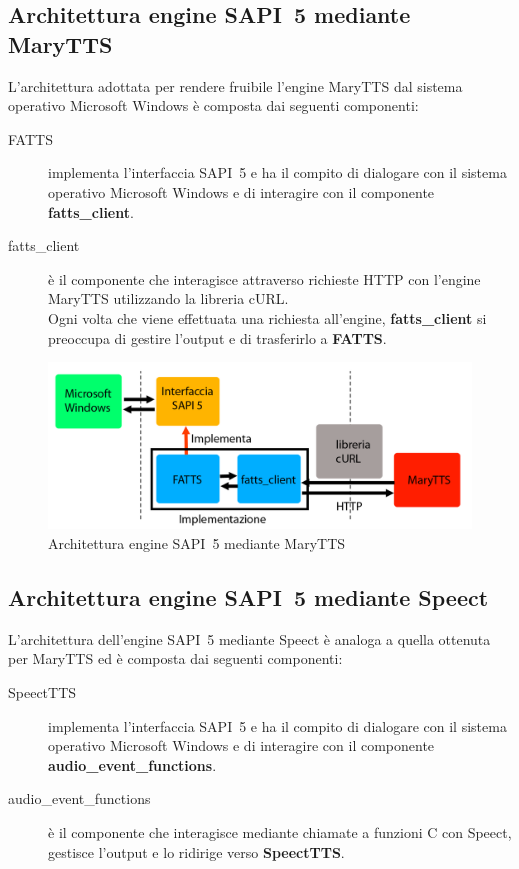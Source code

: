\subsection{Architettura engine SAPI~5 mediante MaryTTS}
L'architettura adottata per rendere fruibile l'engine MaryTTS dal sistema operativo Microsoft Windows è composta dai seguenti componenti:
\begin{description}
	\item[FATTS] implementa l'interfaccia SAPI~5 e ha il compito di dialogare con il sistema operativo Microsoft Windows e di interagire con il componente \textbf{fatts\_client}.
	\item[fatts\_client] è il componente che interagisce attraverso richieste HTTP con l'engine MaryTTS utilizzando la libreria cURL.\\
	Ogni volta che viene effettuata una richiesta all'engine, \textbf{fatts\_client} si preoccupa di gestire l'output e di trasferirlo a \textbf{FATTS}.
\end{description}

\begin{figure}[H]
	\centering
	\includegraphics[width=\textwidth]{images/FATTS-sapi5.png}
	\caption{Architettura engine SAPI~5 mediante MaryTTS}
\end{figure}

\subsection{Architettura engine SAPI~5 mediante Speect}
L'architettura dell'engine SAPI~5 mediante Speect è analoga a quella ottenuta per MaryTTS ed è composta dai seguenti componenti: 
\begin{description}
	\item[SpeectTTS] implementa l'interfaccia SAPI~5 e ha il compito di dialogare con il sistema operativo Microsoft Windows e di interagire con il componente \textbf{audio\_event\_functions}.
	\item[audio\_event\_functions] è il componente che interagisce mediante chiamate a funzioni C con Speect, gestisce l'output e lo ridirige verso \textbf{SpeectTTS}. 
\end{description}

